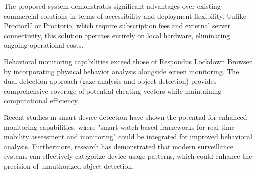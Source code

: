 \documentclass[conference]{IEEEtran}
\begin{document}
The proposed system demonstrates significant advantages over existing commercial solutions in terms of accessibility and deployment flexibility. Unlike ProctorU or Proctorio, which require subscription fees and external server connectivity\cite{proctoru}\cite{proctorio}, this solution operates entirely on local hardware, eliminating ongoing operational costs.

Behavioral monitoring capabilities exceed those of Respondus Lockdown Browser by incorporating physical behavior analysis alongside screen monitoring\cite{respondus}. The dual-detection approach (gaze analysis and object detection) provides comprehensive coverage of potential cheating vectors while maintaining computational efficiency.

Recent studies in smart device detection have shown the potential for enhanced monitoring capabilities, where "smart watch-based frameworks for real-time mobility assessment and monitoring" could be integrated for improved behavioral analysis\cite{kheirkhahan2018smartwatch}. Furthermore, research has demonstrated that modern surveillance systems can effectively categorize device usage patterns, which could enhance the precision of unauthorized object detection\cite{moshawrab2023value}.
\end{document}
